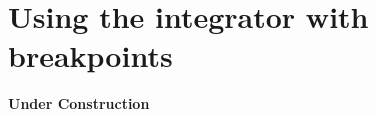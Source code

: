 \newpage
\section{Using the integrator with breakpoints}
\label{sec:app_integrator}

{\bf \large \hspace{4.5cm} Under Construction}
